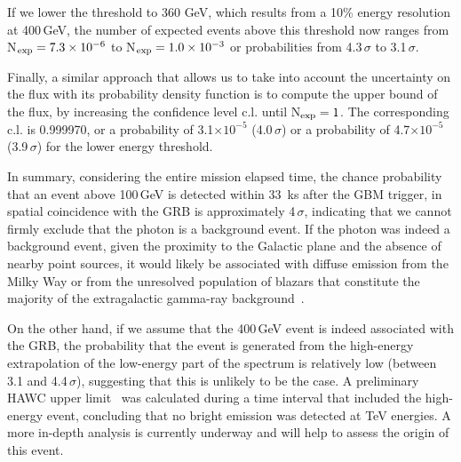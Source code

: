 \documentclass[preprint]{aastex631}
\begin{document}
If we lower the threshold to 360 GeV, which results from a 10\% energy resolution at 400\,GeV, the number of expected events above this threshold now ranges from N$_{\rm exp}=7.3\times10^{-6}$ to N$_{\rm exp}=1.0\times10^{-3}$ or probabilities from 4.3\,$\sigma$ to 3.1\,$\sigma$.

Finally, a similar approach that allows us to take into account the uncertainty on the flux with its probability density function is to compute the upper bound of the flux, by increasing the confidence level c.l. until N$_{\rm exp}=1$. The corresponding c.l. is 0.999970, or a probability of 3.1$\times10^{-5}$ (4.0\,$\sigma$) or a probability of 4.7$\times10^{-5}$ (3.9\,$\sigma$) for the lower energy threshold. 

In summary, considering the entire \Fermi mission elapsed time, the chance probability that an event above 100\,GeV is detected within 33~ks after the GBM trigger, in spatial coincidence with the GRB is approximately 4\,$\sigma$, indicating that we cannot firmly exclude that the photon is a background event. If the photon was indeed a background event, given the proximity to the Galactic plane and the absence of nearby point sources, it would likely be associated with diffuse emission from the Milky Way or from the unresolved population of blazars that constitute the majority of the extragalactic gamma-ray background~\citep{FermiEBL}.

On the other hand, if we assume that the 400\,GeV event is indeed associated with the GRB, the probability that the event is generated from the high-energy extrapolation of the low-energy part of the spectrum is relatively low (between 3.1 and 4.4\,$\sigma$), suggesting that this is unlikely to be the case.
A preliminary HAWC upper limit~\citep{2022GCN.32683....1A} was calculated during a time interval that included the high-energy event, concluding that no bright emission was detected at TeV energies. A more in-depth analysis is currently underway and will help to assess the origin of this event.
\end{document}
